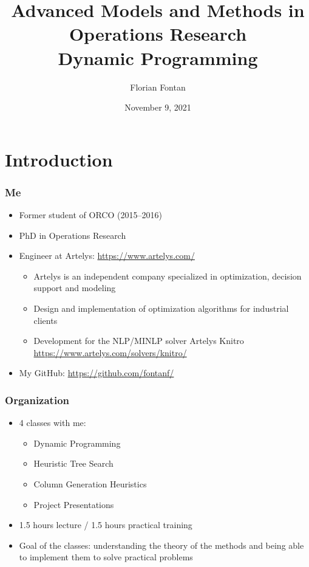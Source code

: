 \documentclass{beamer}
\author{Florian Fontan}
\title{Advanced Models and Methods in Operations Research \\ Dynamic Programming}
\date{November 9, 2021}
\begin{document}
\newcommand{\customcite}[1]{\citetitle{#1}, \citeauthor{#1}, \citeyear{#1}}


\maketitle

\section{Introduction}

\begin{frame}
  \frametitle{Me}

  \begin{itemize}
    \item Former student of ORCO (2015--2016)
    \item PhD in Operations Research
    \item Engineer at Artelys: \url{https://www.artelys.com/}
      \begin{itemize}
        \item Artelys is an independent company specialized in optimization, decision support and modeling
        \item Design and implementation of optimization algorithms for industrial clients
        \item Development for the NLP/MINLP solver Artelys Knitro \url{https://www.artelys.com/solvers/knitro/}
      \end{itemize}
    \item My GitHub: \url{https://github.com/fontanf/}
  \end{itemize}
\end{frame}

\begin{frame}
  \frametitle{Organization}
  \begin{itemize}
    \item 4 classes with me:
      \begin{itemize}
        \item Dynamic Programming
        \item Heuristic Tree Search
        \item Column Generation Heuristics
        \item Project Presentations
      \end{itemize}
    \item 1.5 hours lecture / 1.5 hours practical training
      \item Goal of the classes: understanding the theory of the methods and being able to implement them to solve practical problems
  \end{itemize}
\end{frame}
\end{document}
